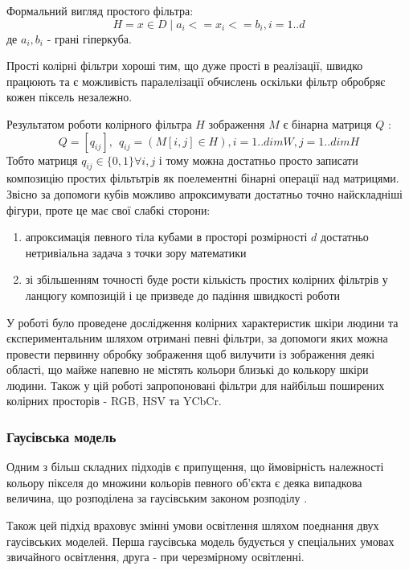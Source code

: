 Формальний вигляд простого фільтра:
\begin{equation}
	\label{eq:simple_color_filter}
	H = {x \in D \mid a_i <= x_i <= b_i, i=1..d}
\end{equation}
	де $a_i,b_i$ - грані гіперкуба.
	
Прості колірні фільтри хороші тим, що дуже прості в реалізації, швидко працюють та є можливість паралелізації обчислень оскільки фільтр обробряє кожен піксель незалежно.

Результатом роботи колірного фільтра $H$ зображення $M$ є бінарна матриця $Q$ :
\begin{equation}
	\label{eq:simple_color_filter_result}
	Q = [q_{ij}], \:\: q_{ij} = ( M[i,j] \in H ), i=1..dimW, j=1..dimH
\end{equation}
Тобто матриця $q_{ij} \in \{0,1\} \forall i,j$ і тому можна достатньо просто записати композицію простих фільтьтрів як поелементні бінарні операції над матрицями. Звісно за допомоги кубів можливо апроксимувати достатньо точно найскладніші фігури, проте це має свої слабкі сторони:
\begin{enumerate}
	\item апроксимація певного тіла кубами в просторі розмірності $d$ достатньо нетривіальна задача з точки зору математики
	\item зі збільшенням точності буде рости кількість простих колірних фільтрів у ланцюгу композицій і це призведе до падіння швидкості роботи
\end{enumerate}

У роботі \cite{ColorFIlters} було проведене дослідження колірних характеристик шкіри людини та єкспериментальним шляхом отримані певні фільтри, за допомоги яких можна провести первинну обробку зображення щоб вилучити із зображення деякі області, що майже напевно не містять кольори близькі до колькору шкіри людини. Також у цій роботі запропоновані фільтри для найбільш поширених колірних просторів - RGB, HSV та YCbCr.

\subsubsection{Гаусівська модель}

Одним з більш складних підходів є припущення, що ймовірність належності кольору пікселя до множини кольорів певного об'єкта є деяка випадкова величина, що розподілена за гаусівським законом розподілу \cite{AdaptiveBigaussian}.

Також цей підхід враховує змінні умови освітлення шляхом поеднання двух гаусівських моделей. Перша гаусівська модель будується у спеціальних умовах звичайного освітлення, друга - при черезмірному освітленні.


